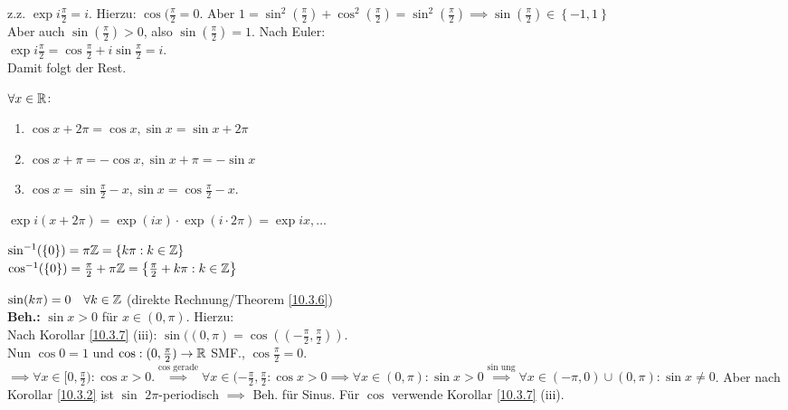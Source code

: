 \begin{subproof}
	z.z. $ \exp i \frac{ \pi }{ 2 } = i $. Hierzu: $ \cos ( \frac{ \pi }{ 2 } = 0 $. Aber $ 1 = \sin^2\left(\frac{ \pi }{ 2 }\right) + \cos^2\left( \frac{ \pi }{ 2 } \right) = \sin^2\left( \frac{ \pi }{ 2 } \right) \implies \sin \left( \frac{ \pi }{ 2 } \right) \in \left\{ -1, 1 \right\}  $\\
	Aber auch $ \sin \left( \frac{ \pi }{ 2 } \right) > 0 $, also $ \sin \left( \frac{ \pi }{ 2 } \right) = 1 $. Nach Euler:\\
	$ \exp i \frac{ \pi }{ 2 } = \cos\frac{ \pi }{ 2 } + i \sin\frac{ \pi }{ 2 } = i $.\\
	Damit folgt der Rest.
\end{subproof}

\begin{subcorollary}[Periodizität]
	$ \forall x \in \mathbb{R}  $:
	\begin{enumerate}[label=(\roman*)]
		\item $ \cos x + 2\pi  = \cos x, \sin x = \sin x + 2\pi  $ 
		\item $ \cos x + \pi = - \cos x, \sin x + \pi = - \sin x $ 
		\item $ \cos x = \sin \frac{ \pi }{ 2 } - x, \sin x = \cos \frac{ \pi }{ 2 } -x $.
	\end{enumerate}
\end{subcorollary}
\begin{subproof*}
	$ \exp i(x + 2\pi ) = \exp (ix)\cdot \exp (i\cdot 2\pi) = \exp ix, \dotsc  $
\end{subproof*}

\begin{subcorollary}
	$ \sin^{-1} (\{0\}) = \pi \mathbb{Z} = \left\{ k \pi : k \in \mathbb{Z}  \right\}  $\\
	$ \cos^{-1} (\{0\}) = \frac{ \pi }{ 2 } + \pi \mathbb{Z} = \left\{ \frac{ \pi }{ 2 } + k \pi : k \in \mathbb{Z}  \right\}  $
\end{subcorollary}
\begin{subproof*}
	$ \sin(k\pi) = 0 \quad \forall k \in \mathbb{Z}  $ (direkte Rechnung/Theorem \ref{10.3.6})\\
	\textbf{Beh.:} $ \sin x > 0 $ für $ x \in (0, \pi) $. Hierzu:\\
	Nach Korollar \ref{10.3.7} (iii): $ \sin( (0, \pi) = \cos\left( \left(-\frac{ \pi }{ 2 } , \frac{ \pi }{ 2 } \right) \right) $.\\
	Nun $ \cos 0 = 1 $ und $ \cos : (0, \frac{ \pi }{ 2 }) \to \mathbb{R}  $ SMF., $ \cos \frac{ \pi }{ 2 } = 0 $.\\
	$ \implies \forall x \in [0, \frac{ \pi }{ 2 } ) : \cos x > 0. \overset{\cos \text{ gerade}}{\implies} \forall x \in (-\frac{ \pi }{ 2 } , \frac{ \pi }{ 2 } : \cos x > 0 \implies  \forall x \in (0, \pi ) : \sin x > 0 \overset{\sin \text{ ung} }{\implies } \forall x \in (-\pi, 0) \cup (0, \pi): \sin x \neq 0  $. Aber nach Korollar \ref{10.3.2} ist $ \sin  $ $ 2\pi  $-periodisch $ \implies  $ Beh. für Sinus. Für $ \cos  $ verwende Korollar \ref{10.3.7} (iii).
\end{subproof*}

